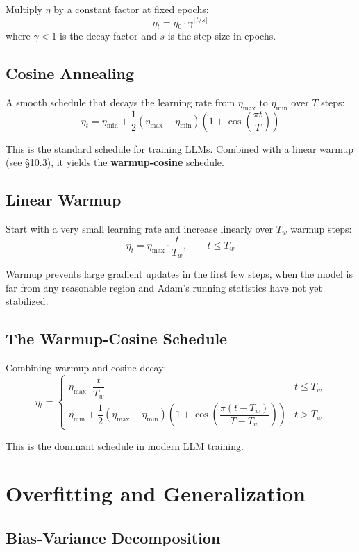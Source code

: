\documentclass[main.tex]{subfiles}
\begin{document}
Multiply $\eta$ by a constant factor at fixed epochs:
$$\eta_t = \eta_0 \cdot \gamma^{\lfloor t / s \rfloor}$$
where $\gamma < 1$ is the decay factor and $s$ is the step size in epochs.

\subsection{Cosine Annealing}

A smooth schedule that decays the learning rate from $\eta_{\max}$ to $\eta_{\min}$ over $T$ steps:
$$\eta_t = \eta_{\min} + \frac{1}{2}(\eta_{\max} - \eta_{\min})\left(1 + \cos\!\left(\frac{\pi t}{T}\right)\right)$$

This is the standard schedule for training LLMs. Combined with a linear warmup (see \S10.3), it yields the \textbf{warmup-cosine} schedule.

\subsection{Linear Warmup}

Start with a very small learning rate and increase linearly over $T_w$ warmup steps:
$$\eta_t = \eta_{\max} \cdot \frac{t}{T_w}, \qquad t \leq T_w$$

Warmup prevents large gradient updates in the first few steps, when the model is far from any reasonable region and Adam's running statistics have not yet stabilized.

\subsection{The Warmup-Cosine Schedule}

Combining warmup and cosine decay:
$$\eta_t = \begin{cases} \eta_{\max} \cdot \dfrac{t}{T_w} & t \leq T_w \\[8pt] \eta_{\min} + \dfrac{1}{2}(\eta_{\max} - \eta_{\min})\left(1 + \cos\!\left(\dfrac{\pi(t - T_w)}{T - T_w}\right)\right) & t > T_w \end{cases}$$

This is the dominant schedule in modern LLM training.

\needspace{0.33\textheight}
\section{Overfitting and Generalization}

\subsection{Bias-Variance Decomposition}
\end{document}
